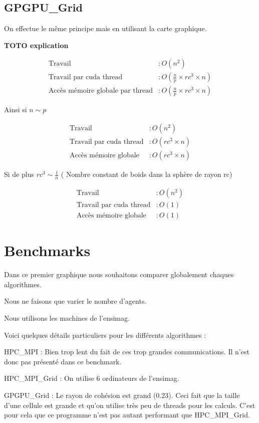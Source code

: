 \documentclass[liens,entete-ensimag,margeCorrection]{ensirapport}
\begin{document}
\subsection{GPGPU\_Grid}
On effectue le même principe mais en utilisant la carte graphique.

\textbf{TOTO explication}

\begin{align*}
    \text{Travail} &: O\left( n^2 \right) \\
    \text{Travail par cuda thread} &: O\left( \frac n p \times rc^3 \times n \right)  \\
    \text{Accès mémoire globale par thread} &: O\left( \frac n p \times rc^3 \times n \right)
\end{align*}

Ainsi si $n \sim p$

\begin{align*}
    \text{Travail} &: O\left( n^2 \right) \\
    \text{Travail par cuda thread} &: O\left( rc^3 \times n \right)  \\
    \text{Accès mémoire globale} &: O\left( rc^3 \times n \right)
\end{align*}

Si de plus  $ rc^3 \sim \frac 1n$  ( Nombre constant de boids dans la sphère de rayon rc)

\begin{align*}
    \text{Travail} &: O\left( n^2 \right) \\
    \text{Travail par cuda thread} &: O\left( 1 \right)  \\
    \text{Accès mémoire globale} &: O\left( 1\right)
\end{align*}

\section{Benchmarks}

Dans ce premier graphique nous souhaitons comparer globalement chaques algorithmes.

Nous ne faisons que varier le nombre d'agents.

Nous utilisons les machines de l'ensimag.

Voici quelques détails particuliers pour les différents algorithmes :

\begin{description}
    \item {HPC\_MPI} : Bien trop lent du fait de ces trop grandes communications. Il n'est donc pas présenté dans ce benchmark.
    \item {HPC\_MPI\_Grid} : On utilise 6 ordinateurs de l'ensimag.
    \item {GPGPU\_Grid} : Le rayon de cohésion est grand (0.23). Ceci fait que la taille d'une cellule est grande  et qu'on utilise très peu de threads pour les calculs.
        C'est pour cela que ce programme n'est pas autant performant que HPC\_MPI\_Grid.
\end{description}
\end{document}
